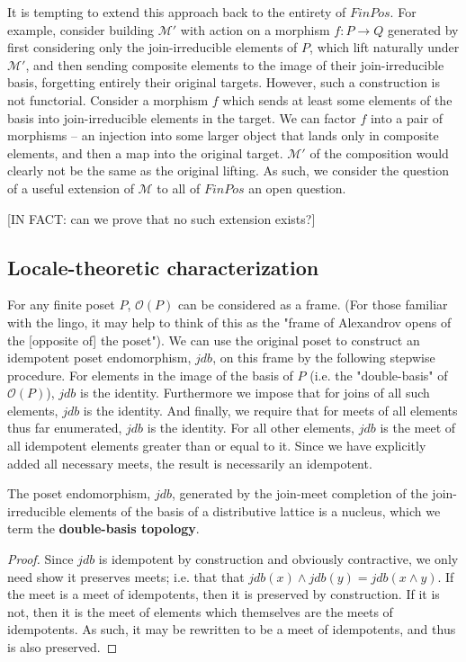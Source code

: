 \documentclass[hoptionsi,review,format=sigplan]{acmart}
\theoremstyle{definition}
\newcommand{\Mcc}{\mathcal{M}}
\newcommand{\Oc}{\mathcal{O}}
\begin{document}

It is tempting to extend this approach back to the entirety of \(FinPos\). For example, consider building \(\Mcc'\)  with action on a morphism \(f : P \rightarrow Q\) generated by first considering only the join-irreducible elements of \(P\), which lift naturally under \(\Mcc'\), and then sending composite elements to the image of their join-irreducible basis, forgetting entirely their original targets. However, such a construction is not functorial. Consider a morphism \(f\) which sends at least some  elements of the basis into join-irreducible elements in the target. We can factor \(f\) into a pair of morphisms -- an injection into some larger object that lands only in composite elements, and then a map into the original target. \(\Mcc'\) of the composition would clearly not be the same as the original lifting. As such, we consider the question of a useful extension of \(\Mcc\) to all of \(FinPos\) an open question. 

[IN FACT: can we prove that no such extension exists?]

\subsection{Locale-theoretic characterization}

For any finite poset \(P\), \(\Oc(P)\) can be considered as a frame. (For those familiar with the lingo, it may help to think of this as the "frame of Alexandrov opens of the [opposite of] the poset"). We can use the original poset to construct an idempotent poset endomorphism, \(jdb\), on this frame by the following stepwise procedure. For elements in the image of the basis of \(P\) (i.e. the "double-basis" of \(\Oc(P)\)), \(jdb\) is the identity. Furthermore we impose that for joins of all such elements, \(jdb\) is the identity. And finally, we require that for meets of all elements thus far enumerated, \(jdb\) is the identity. For all other elements, \(jdb\) is the meet of all idempotent elements greater than or equal to it. Since we have explicitly added all necessary meets, the result is necessarily an idempotent.

\begin{lemma}
The poset endomorphism, \(jdb\), generated by the join-meet completion of the join-irreducible elements of the basis of a distributive lattice is a nucleus, which we term the \textbf{double-basis topology}.
\end{lemma}
\begin{proof}
Since \(jdb\) is idempotent by construction and obviously contractive, we only need show it preserves meets; i.e. that that \(jdb(x) \wedge jdb(y) = jdb(x  \wedge  y)\).  If the meet is a meet of idempotents, then it is preserved by construction. If it is not, then it is the meet of elements which themselves are the meets of idempotents. As such, it may be rewritten to be a meet of idempotents, and thus is also preserved.
\end{proof}
\end{document}

